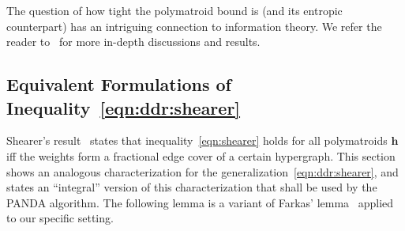 \documentclass{theoretics}
\newcommand{\panda}{\textsf{PANDA}\xspace}
\begin{document}
The question of how tight the polymatroid bound is (and its entropic counterpart) has
an intriguing connection to information theory. We refer the reader to~\cite{DBLP:conf/pods/Khamis0S17,10175769}
for more in-depth discussions and results.

\subsection{Equivalent Formulations of Inequality~\eqref{eqn:ddr:shearer}}
\label{subsec:equivalent}

Shearer's result~\cite{MR859293} states that inequality~\eqref{eqn:shearer} holds for all
polymatroids $\bm h$ iff the weights form a fractional edge cover of a certain hypergraph.
This section shows an analogous characterization for the
generalization~\eqref{eqn:ddr:shearer}, and states an ``integral'' version of this
characterization that shall be used by the \panda algorithm.
The following lemma is a variant of Farkas' lemma~\cite{schrijver-book} applied to our specific setting.
\end{document}
